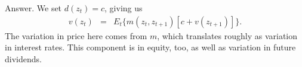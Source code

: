\documentclass[11pt]{article}
\begin{document}
\begin{enumerate}
Answer.  We set $d(z_t) = c$, giving us
\begin{eqnarray*}
    v(z_t) &=& E_t \big\{ m(z_t,z_{t+1}) [c + v(z_{t+1})] \big\} .
\end{eqnarray*}
The variation in price here comes from $m$, which translates roughly
as variation in interest rates.
This component is in equity, too, as well as variation in future dividends.


\begin{comment}
\item {\it Consols.\/}
A consol is a perpetual bond:  it pays a coupon $c$ every period forever.
How would we value one in an exponential-affine setting?
Consider the pricing kernel
\begin{eqnarray*}
    \log m_{t+1} &=& \delta + z_t + \lambda w_{t+1} \\
    z_{t+1} &=& \varphi z_t + \sigma w_{t+1} ,
\end{eqnarray*}
where $ 0 < \varphi < 1$ and $\{ w_t\} $ is a sequence
of independent standard normal random variables.
As we've seen, this structure gives us loglinear
bond prices:
$ \log q^n(z_t) = A_n + B_n z_t $.
%
\begin{enumerate}
\item Use (\ref{eq:recursion-bond}) to find recursions for the coefficients
$(A_n,B_n)$.
\item Use your answer to find the price of a consol.
\end{enumerate}
{\it Comment about notation\/}:
$m(z_t,z_{t+1})$ is the most accurate notation,
but we (meaning economists in general) often use $m_{t,t+1}$ or $m_{t+1}$
to mean the same.
They're less accurate, but easier to write.

\item {\it Representative agent asset pricing.\/}
(Adapted from an exercise in Ljungqvist and Sargent, {\it Recursive Macroeconomic Theory\/}.)
Consider the representative agent model with additive preferences
\begin{eqnarray*}
    U_t &=& E_t \sum_{n=0}^\infty \beta^n c_{t+n}^{1-\alpha} /(1-\alpha) .
\end{eqnarray*}
The agent's marginal rate of substitution is the pricing kernel,
 $ m_{t+1} = \beta (c_{t+1}/c_t)^{-\alpha} $.

Now suppose the growth rate $g_{t+1} = c_{t+1}/c_t$ follows
\begin{eqnarray*}
    \log g_{t+1} &=& z_t + \theta w_{t+1} \\
    z_{t+1} &=& \varphi z_t + \sigma w_{t+1}
\end{eqnarray*}
with $0 < \varphi < 1$ and $\{ w_t \}$ a sequence of iid standard normal random variables.
%
\begin{enumerate}
\item Bond prices in this economy take the form
$ \log q^n(z_t) = A_n + B_n z_t $.
Use the pricing relation $ q^{n+1}_t = E_t (m_{t+1} q^n_{t+1}) $
to compute recursions for $(A_n,B_n)$.


\end{comment}
\end{enumerate}
\end{document}
